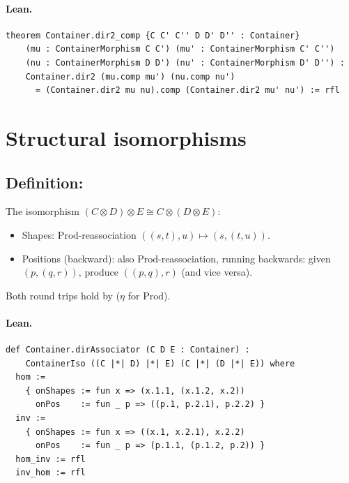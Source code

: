 \documentclass[11pt,a4paper]{article}
\begin{document}
\paragraph{Lean.}
\begin{lstlisting}[style=lean]
theorem Container.dir2_comp {C C' C'' D D' D'' : Container}
    (mu : ContainerMorphism C C') (mu' : ContainerMorphism C' C'')
    (nu : ContainerMorphism D D') (nu' : ContainerMorphism D' D'') :
    Container.dir2 (mu.comp mu') (nu.comp nu')
      = (Container.dir2 mu nu).comp (Container.dir2 mu' nu') := rfl
\end{lstlisting}


\section{Structural isomorphisms}

\subsection{Definition: }

\begin{defn}
The isomorphism $(C \otimes D) \otimes E \cong C \otimes (D \otimes E)$:
\begin{itemize}
  \item Shapes: $\mathrm{Prod}$-reassociation $((s,t),u) \mapsto (s,(t,u))$.
  \item Positions (backward): also $\mathrm{Prod}$-reassociation, running backwards:
    given $(p,(q,r))$, produce $((p,q),r)$ (and vice versa).
\end{itemize}
Both round trips hold by  ($\eta$ for $\mathrm{Prod}$).
\end{defn}

\paragraph{Lean.}
\begin{lstlisting}[style=lean]
def Container.dirAssociator (C D E : Container) :
    ContainerIso ((C |*| D) |*| E) (C |*| (D |*| E)) where
  hom :=
    { onShapes := fun x => (x.1.1, (x.1.2, x.2))
      onPos    := fun _ p => ((p.1, p.2.1), p.2.2) }
  inv :=
    { onShapes := fun x => ((x.1, x.2.1), x.2.2)
      onPos    := fun _ p => (p.1.1, (p.1.2, p.2)) }
  hom_inv := rfl
  inv_hom := rfl
\end{lstlisting}
\end{document}
